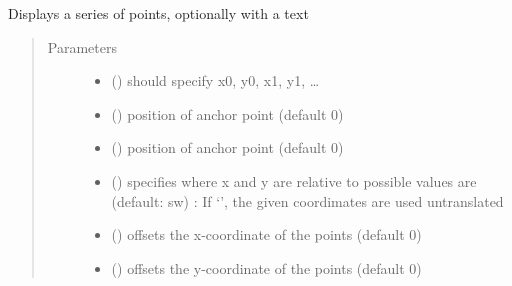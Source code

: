 \documentclass[letterpaper,10pt,english]{sphinxmanual}
\begin{document}
\begin{fulllineitems}
\label{\detokenize{Reference:salabim.AnimatePoints}}
Displays a series of points, optionally with a text
\begin{quote}\begin{description}
\item[{Parameters}] \leavevmode\begin{itemize}
\item {} 
 () \textendash{} should specify x0, y0, x1, y1, …

\item {} 
 () \textendash{} position of anchor point (default 0)

\item {} 
 () \textendash{} position of anchor point (default 0)

\item {} 
 () \textendash{} specifies where x and y are relative to 
possible values are (default: sw) : 
If ‘’, the given coordimates are used untranslated

\item {} 
 () \textendash{} offsets the x-coordinate of the points (default 0)

\item {} 
 () \textendash{} offsets the y-coordinate of the points (default 0)


\end{itemize}
\end{description}
\end{quote}
\end{fulllineitems}
\end{document}
